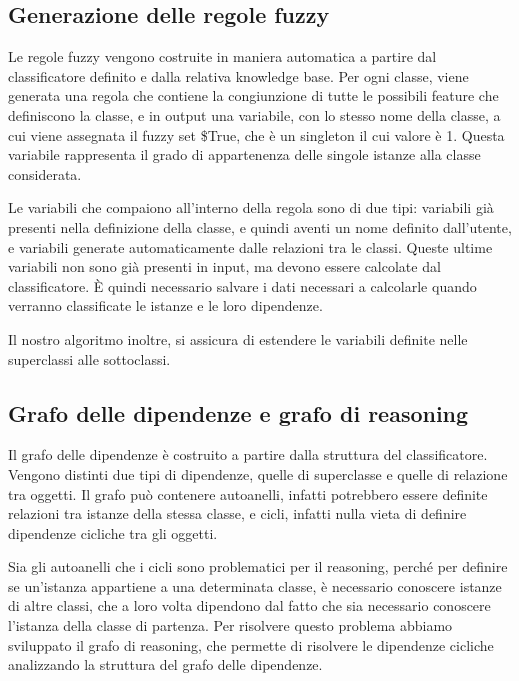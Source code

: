 \subsection{Generazione delle regole fuzzy}

Le regole fuzzy vengono costruite in maniera automatica a partire dal classificatore definito e dalla relativa knowledge base. Per ogni classe, viene generata una regola che contiene la congiunzione di tutte le possibili feature che definiscono la classe, e in output una variabile, con lo stesso nome della classe, a cui viene assegnata il fuzzy set \$True, che è un singleton il cui valore è 1. Questa variabile rappresenta il grado di appartenenza delle singole istanze alla classe considerata.

Le variabili che compaiono all'interno della regola sono di due tipi: variabili già presenti nella definizione della classe, e quindi aventi un nome definito dall'utente, e variabili generate automaticamente dalle relazioni tra le classi. Queste ultime variabili non sono già presenti in input, ma devono essere calcolate dal classificatore. \`E quindi necessario salvare i dati necessari a calcolarle quando verranno classificate le istanze e le loro dipendenze.

Il nostro algoritmo inoltre, si assicura di estendere le variabili definite nelle superclassi alle sottoclassi.

\subsection{Grafo delle dipendenze e grafo di reasoning}

Il grafo delle dipendenze è costruito a partire dalla struttura del classificatore. Vengono distinti due tipi di dipendenze, quelle di superclasse e quelle di relazione tra oggetti. Il grafo può contenere autoanelli, infatti potrebbero essere definite relazioni tra istanze della stessa classe, e cicli, infatti nulla vieta di definire dipendenze cicliche tra gli oggetti.

Sia gli autoanelli che i cicli sono problematici per il reasoning, perché per definire se un'istanza appartiene a una determinata classe, è necessario conoscere istanze di altre classi, che a loro volta dipendono dal fatto che sia necessario conoscere l'istanza della classe di partenza. Per risolvere questo problema abbiamo sviluppato il grafo di reasoning, che permette di risolvere le dipendenze cicliche analizzando la struttura del grafo delle dipendenze.

